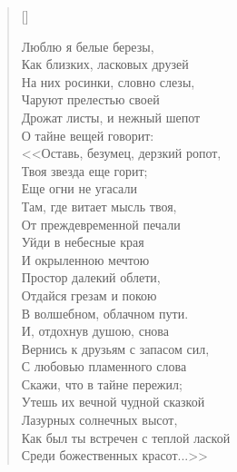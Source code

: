 \settowidth{\versewidth}{Как был ты встречен с теплой лаской}
\begin{verse}[\versewidth]
\begin{altverse}
Люблю я белые березы,\\
Как близких, ласковых друзей\ldotst\\
На них росинки, словно слезы,\\
Чаруют прелестью своей\ldotst\\
Дрожат листы, и нежный шепот\\
О тайне вещей говорит:\\
<<Оставь, безумец, дерзкий ропот,\\
Твоя звезда еще горит;\\
Еще огни не угасали\\
Там, где витает мысль твоя,\\
От преждевременной печали\\
Уйди в небесные края\ldotst\\
И окрыленною мечтою\\
Простор далекий облети,\\
Отдайся грезам и покою\\
В волшебном, облачном пути.\\
И, отдохнув душою, снова\\
Вернись к друзьям с запасом сил,\\
С любовью пламенного слова\\
Скажи, что в тайне пережил;\\
Утешь их вечной чудной сказкой\\
Лазурных солнечных высот,\\
Как был ты встречен с теплой лаской\\
Среди божественных красот...>>
\end{altverse}
\end{verse}


\newpage
\vspace*{0cm}




